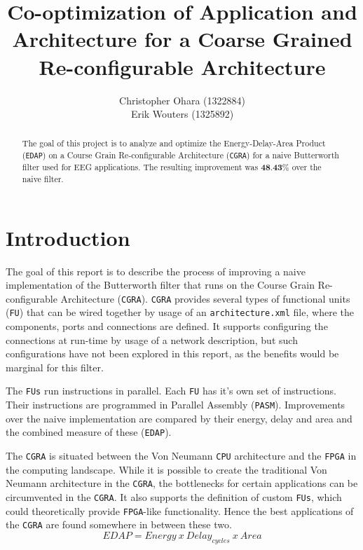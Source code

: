 \documentclass[letterpaper, 10 pt, conference]{ieeeconf}  %
\title{\LARGE \bf
Co-optimization of Application and Architecture
for a Coarse Grained Re-configurable Architecture
}
\author{Christopher Ohara (1322884) \\
Erik Wouters (1325892)
}
\begin{document}
\maketitle
\thispagestyle{empty}
\pagestyle{empty}

\begin{abstract}

The goal of this project is to analyze and optimize the Energy-Delay-Area Product (\texttt{EDAP}) on a Course Grain Re-configurable Architecture (\texttt{CGRA}) for a naive Butterworth filter used for EEG applications. The resulting improvement was $\textbf{48.43\%}$ over the naive filter.

\end{abstract}

\section{Introduction}

The goal of this report is to describe the process of improving a naive implementation of the Butterworth filter\cite{Podder} that runs on the Course Grain Re-configurable Architecture (\texttt{CGRA}). \texttt{CGRA} provides several types of functional units (\texttt{FU}) that can be wired together by usage of an \texttt{architecture.xml} file, where the components, ports and connections are defined. It supports configuring the connections at run-time by usage of a network description, but such configurations have not been explored in this report, as the benefits would be marginal for this filter.

The \texttt{FUs} run instructions in parallel. Each \texttt{FU} has it's own set of instructions. Their instructions are programmed in Parallel Assembly (\texttt{PASM}). Improvements over the naive implementation are compared by their energy, delay and area and the combined measure of these (\texttt{EDAP}).

The \texttt{CGRA} is situated between the Von Neumann \texttt{CPU} architecture\cite{Neumann} and the \texttt{FPGA} in the computing landscape. While it is possible to create the traditional Von Neumann architecture in the \texttt{CGRA}, the bottlenecks for certain applications can be circumvented in the \texttt{CGRA}. It also supports the definition of custom \texttt{FUs}, which could theoretically provide \texttt{FPGA}-like functionality. Hence the best applications of the \texttt{CGRA} are found somewhere in between these two.
\[
EDAP = Energy \  x \  Delay_{cycles} \ x  \
Area 
\]
\end{document}
